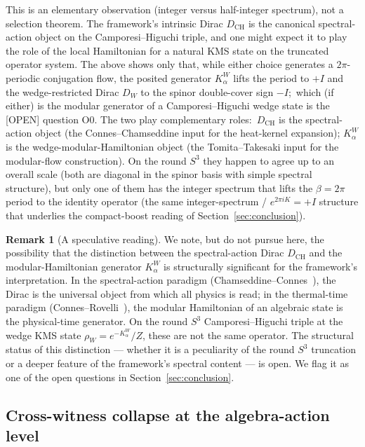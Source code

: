 \documentclass[11pt,a4paper]{article}
\theoremstyle{plain}
\theoremstyle{definition}
\newtheorem{remark}[theorem]{Remark}
\newcommand{\sthree}{S^{3}}
\newcommand{\DCH}{D_{\mathrm{CH}}}
\begin{document}
This is an elementary observation (integer versus half-integer
spectrum), not a selection theorem. The framework's intrinsic
Dirac $\DCH$ is the canonical spectral-action object on the
Camporesi--Higuchi triple, and one might expect it to play the
role of the local Hamiltonian for a natural KMS state on the
truncated operator system. The above shows only that, while either
choice generates a $2\pi$-periodic conjugation flow, the posited
generator $K_\alpha^W$ lifts the period to $+I$ and the
wedge-restricted Dirac $D_W$ to the spinor double-cover sign $-I$;\
which (if either) is the modular generator of a Camporesi--Higuchi
wedge state is the [OPEN] question O0. The two play
complementary roles:\
$\DCH$ is the spectral-action object (the Connes--Chamseddine input
for the heat-kernel expansion); $K_\alpha^W$ is the
wedge-modular-Hamiltonian object (the Tomita--Takesaki input for the
modular-flow construction). On the round $\sthree$ they happen to
agree up to an overall scale (both are diagonal in the spinor basis
with simple spectral structure), but only one of them has the integer
spectrum that lifts the $\beta = 2\pi$ period to the identity operator
(the same integer-spectrum / $e^{2\pi i K} = +I$ structure
that underlies the compact-boost reading of
Section~\ref{sec:conclusion}).

\begin{remark}[A speculative reading]\label{rem:speculation}
We note, but do not pursue here, the possibility that the
distinction between the spectral-action Dirac $\DCH$ and the
modular-Hamiltonian generator $K_\alpha^W$ is structurally significant
for the framework's interpretation. In the spectral-action paradigm
(Chamseddine--Connes~\cite{chamseddine_connes2010}), the Dirac is the
universal object from which all physics is read; in the
thermal-time paradigm (Connes--Rovelli~\cite{connes_rovelli1994}), the
modular Hamiltonian of an algebraic state is the physical-time generator.
On the round $\sthree$ Camporesi--Higuchi triple at the wedge KMS
state $\rho_W = e^{-K_\alpha^W}/Z$, these are not the same operator.
The structural status of this distinction --- whether it is a
peculiarity of the round $\sthree$ truncation or a deeper feature of
the framework's spectral content --- is open. We flag it as one of
the open questions in Section~\ref{sec:conclusion}.
\end{remark}

\subsection{Cross-witness collapse at the algebra-action level}
\label{sec:cross_witness_algebra}
\end{document}
